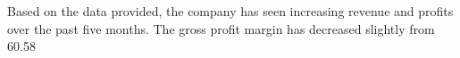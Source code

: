 

Based on the data provided, the company has seen increasing revenue and profits over the past five months. The gross profit margin has decreased slightly from 60.58%